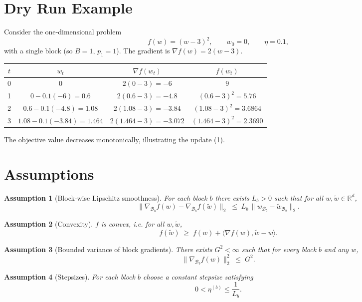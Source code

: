 \documentclass{article}
\newtheorem{assumption}{Assumption}
\newcommand{\R}{\mathbb{R}}
\begin{document}
\section*{Dry Run Example}
Consider the one‑dimensional problem
\[
f(w)=(w-3)^{2},\qquad w_{0}=0,\qquad \eta=0.1,
\]
with a single block (so $B=1$, $p_{1}=1$).  
The gradient is $\nabla f(w)=2(w-3)$.  

\begin{center}
\begin{tabular}{c|c|c|c}
$t$ & $w_{t}$ & $\nabla f(w_{t})$ & $f(w_{t})$\\ \hline
0 & $0$ & $2(0-3)=-6$ & $9$\\
1 & $0-0.1(-6)=0.6$ & $2(0.6-3)=-4.8$ & $(0.6-3)^{2}=5.76$\\
2 & $0.6-0.1(-4.8)=1.08$ & $2(1.08-3)=-3.84$ & $(1.08-3)^{2}=3.6864$\\
3 & $1.08-0.1(-3.84)=1.464$ & $2(1.464-3)=-3.072$ & $(1.464-3)^{2}=2.3690$
\end{tabular}
\end{center}
The objective value decreases monotonically, illustrating the update (1).

\newpage

\section*{Assumptions}
\begin{assumption}[Block‑wise Lipschitz smoothness]\label{ass:Lip}
For each block $b$ there exists $L_{b}>0$ such that for all $w,\tilde w\in\R^{d}$,
\[
\bigl\|\nabla_{\mathcal{B}_{b}}f(w)-\nabla_{\mathcal{B}_{b}}f(\tilde w)\bigr\|_{2}
\;\le\;
L_{b}\,\bigl\|w_{\mathcal{B}_{b}}-\tilde w_{\mathcal{B}_{b}}\bigr\|_{2}.
\tag{2}
\]
\end{assumption}
\begin{assumption}[Convexity]\label{ass:convex}
$f$ is convex, i.e. for all $w,\tilde w$,
\[
f(\tilde w)\;\ge\;f(w)+\langle \nabla f(w),\tilde w-w\rangle .
\tag{3}
\]
\end{assumption}
\begin{assumption}[Bounded variance of block gradients]\label{ass:bounded}
There exists $G^{2}<\infty$ such that for every block $b$ and any $w$,
\[
\bigl\|\nabla_{\mathcal{B}_{b}}f(w)\bigr\|_{2}^{2}\;\le\;G^{2}.
\tag{4}
\]
\end{assumption}
\begin{assumption}[Stepsizes]\label{ass:stepsize}
For each block $b$ choose a constant stepsize satisfying
\[
0<\eta^{(b)}\le\frac{1}{L_{b}} .
\tag{5}
\]
\end{assumption}
\end{document}
